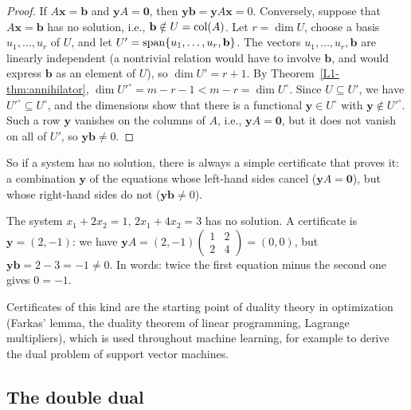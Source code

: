 \begin{proof}
    If $A\mathbf{x} = \mathbf{b}$ and $\mathbf{y}A = \mathbf{0}$, then $\mathbf{y}\mathbf{b} = \mathbf{y}A\mathbf{x} = 0$. Conversely, suppose that $A\mathbf{x} = \mathbf{b}$ has no solution, i.e., $\mathbf{b} \notin U = \operatorname{col}(A)$. Let $r = \dim U$, choose a basis $u_1, \ldots, u_r$ of $U$, and let $U' = \operatorname{span}\{u_1, \ldots, u_r, \mathbf{b}\}$. The vectors $u_1, \ldots, u_r, \mathbf{b}$ are linearly independent (a nontrivial relation would have to involve $\mathbf{b}$, and would express $\mathbf{b}$ as an element of $U$), so $\dim U' = r + 1$. By Theorem~\ref{L1-thm:annihilator}, $\dim {U'}^\circ = m - r - 1 < m - r = \dim U^\circ$. Since $U \subseteq U'$, we have ${U'}^\circ \subseteq U^\circ$, and the dimensions show that there is a functional $\mathbf{y} \in U^\circ$ with $\mathbf{y} \notin {U'}^\circ$. Such a row $\mathbf{y}$ vanishes on the columns of $A$, i.e., $\mathbf{y}A = \mathbf{0}$, but it does not vanish on all of $U'$, so $\mathbf{y}\mathbf{b} \neq 0$.
\end{proof}

So if a system has no solution, there is always a simple certificate that proves it: a combination $\mathbf{y}$ of the equations whose left-hand sides cancel ($\mathbf{y}A = \mathbf{0}$), but whose right-hand sides do not ($\mathbf{y}\mathbf{b} \neq 0$).

\begin{example}
    The system $x_1 + 2x_2 = 1$, $2x_1 + 4x_2 = 3$ has no solution. A certificate is $\mathbf{y} = (2, -1)$: we have $\mathbf{y}A = (2, -1)\begin{pmatrix} 1 & 2 \\ 2 & 4 \end{pmatrix} = (0, 0)$, but $\mathbf{y}\mathbf{b} = 2 - 3 = -1 \neq 0$. In words: twice the first equation minus the second one gives $0 = -1$.
\end{example}

\begin{remark}
    Certificates of this kind are the starting point of duality theory in optimization (Farkas' lemma, the duality theorem of linear programming, Lagrange multipliers), which is used throughout machine learning, for example to derive the dual problem of support vector machines.
\end{remark}

\subsection{The double dual}

